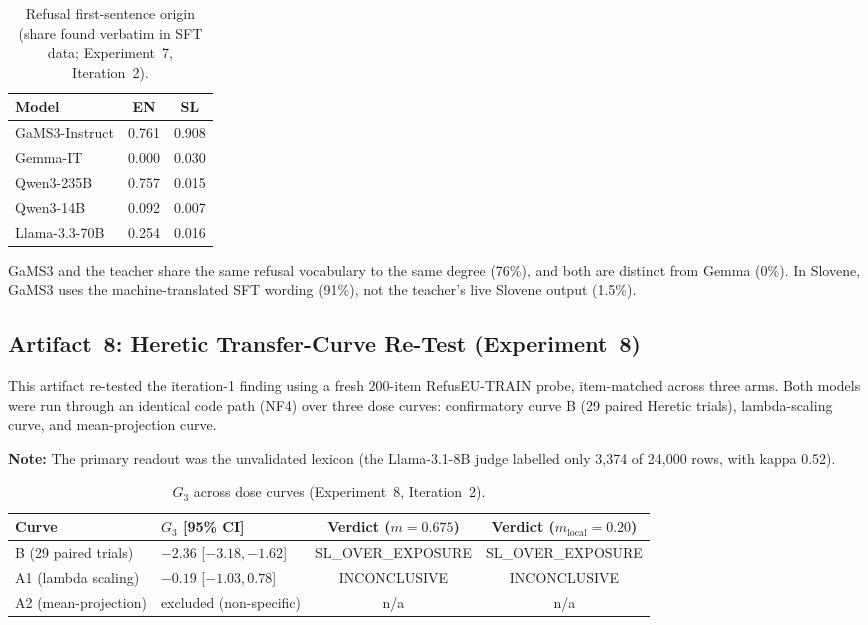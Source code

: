 \documentclass[11pt,letterpaper]{article}
\begin{document}
\begin{table}[!htbp]
\centering
\caption{Refusal first-sentence origin (share found verbatim in SFT data; Experiment~7, Iteration~2).}
\label{tab:wording_exp7}
\begin{tabular}{lcc}
\toprule
Model & EN & SL \\
\midrule
GaMS3-Instruct & 0.761 & 0.908 \\
Gemma-IT & 0.000 & 0.030 \\
Qwen3-235B & 0.757 & 0.015 \\
Qwen3-14B & 0.092 & 0.007 \\
Llama-3.3-70B & 0.254 & 0.016 \\
\bottomrule
\end{tabular}
\end{table}

GaMS3 and the teacher share the same refusal vocabulary to the same degree (76\%), and both are distinct from Gemma (0\%). In Slovene, GaMS3 uses the machine-translated SFT wording (91\%), not the teacher's live Slovene output (1.5\%).

\subsection{Artifact~8: Heretic Transfer-Curve Re-Test (Experiment~8)}
\label{gen_art_experiment_8}

This artifact re-tested the iteration-1 finding using a fresh 200-item RefusEU-TRAIN probe, item-matched across three arms. Both models were run through an identical code path (NF4) over three dose curves: confirmatory curve B (29 paired Heretic trials), lambda-scaling curve, and mean-projection curve.

\textbf{Note:} The primary readout was the unvalidated lexicon (the Llama-3.1-8B judge labelled only 3,374 of 24,000 rows, with kappa 0.52).

\begin{table}[!htbp]
\centering
\caption{$G_3$ across dose curves (Experiment~8, Iteration~2).}
\label{tab:g3_exp8}
\begin{tabularx}{\linewidth}{lXcc}
\toprule
Curve & $G_3$ [95\% CI] & Verdict ($m = 0.675$) & Verdict ($m_{\text{local}} = 0.20$) \\
\midrule
B (29 paired trials) & $-2.36$ [$-3.18, -1.62$] & SL\_OVER\_EXPOSURE & SL\_OVER\_EXPOSURE \\
A1 (lambda scaling) & $-0.19$ [$-1.03, 0.78$] & INCONCLUSIVE & INCONCLUSIVE \\
A2 (mean-projection) & excluded (non-specific) & n/a & n/a \\
\bottomrule
\end{tabularx}
\end{table}
\end{document}
